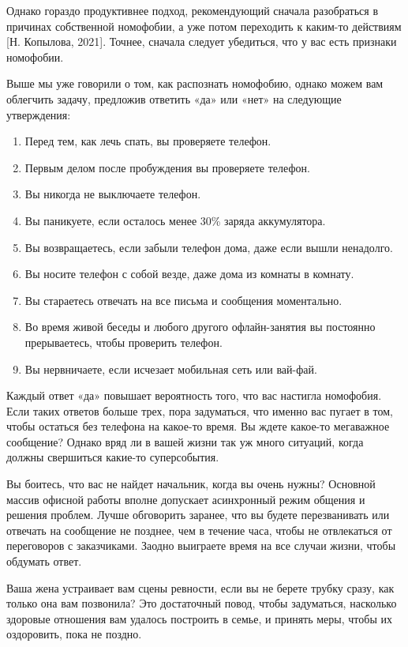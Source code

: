 Однако гораздо продуктивнее подход, рекомендующий сначала разобраться в причинах собственной номофобии, а уже потом переходить к каким-то действиям [Н. Копылова, 2021]. Точнее, сначала следует убедиться, что у вас есть признаки номофобии.

Выше мы уже говорили о том, как распознать номофобию, однако можем вам облегчить задачу, предложив ответить «да» или «нет» на следующие утверждения:
\begin{enumerate}
    \item Перед тем, как лечь спать, вы проверяете телефон.
    \item Первым делом после пробуждения вы проверяете телефон.
    \item Вы никогда не выключаете телефон.
    \item Вы паникуете, если осталось менее 30\% заряда аккумулятора.
    \item Вы возвращаетесь, если забыли телефон дома, даже если вышли ненадолго.
    \item Вы носите телефон с собой везде, даже дома из комнаты в комнату.
    \item Вы стараетесь отвечать на все письма и сообщения моментально.
    \item Во время живой беседы и любого другого офлайн-занятия вы постоянно прерываетесь, чтобы проверить телефон.
    \item Вы нервничаете, если исчезает мобильная сеть или вай-фай.
\end{enumerate}

Каждый ответ «да» повышает вероятность того, что вас настигла номофобия. Если таких ответов больше трех, пора задуматься, что именно вас пугает в том, чтобы остаться без телефона на какое-то время. Вы ждете какое-то мегаважное сообщение? Однако вряд ли в вашей жизни так уж много ситуаций, когда должны свершиться какие-то суперсобытия.

Вы боитесь, что вас не найдет начальник, когда вы очень нужны? Основной массив офисной работы вполне допускает асинхронный режим общения и решения проблем. Лучше обговорить заранее, что вы будете перезванивать или отвечать на сообщение не позднее, чем в течение часа, чтобы не отвлекаться от переговоров с заказчиками. Заодно выиграете время на все случаи жизни, чтобы обдумать ответ.

Ваша жена устраивает вам сцены ревности, если вы не берете трубку сразу, как только она вам позвонила? Это достаточный повод, чтобы задуматься, насколько здоровые отношения вам удалось построить в семье, и принять меры, чтобы их оздоровить, пока не поздно.

